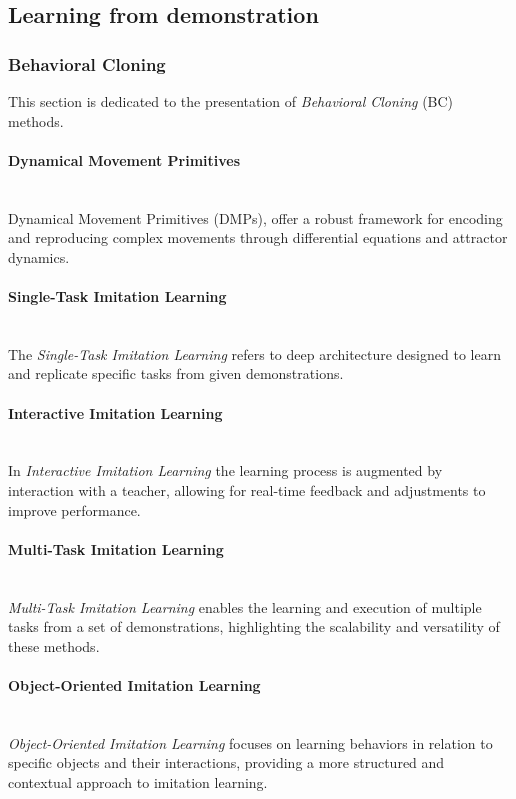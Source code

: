 \subsection{Learning from demonstration}
\label{sec:lfd}
\subsubsection{Behavioral Cloning}
This section is dedicated to the presentation of \textit{ Behavioral Cloning} (BC) methods.
\paragraph*{Dynamical Movement Primitives}\mbox{}\\
Dynamical Movement Primitives (DMPs), offer a robust framework for encoding and reproducing complex movements through differential equations and attractor dynamics.
\paragraph*{Single-Task Imitation Learning}\mbox{}\\
The \textit{Single-Task Imitation Learning} refers to deep architecture designed to learn and replicate specific tasks from given demonstrations.
\paragraph*{Interactive Imitation Learning}\mbox{}\\
In \textit{Interactive Imitation Learning} the learning process is augmented by interaction with a teacher, allowing for real-time feedback and adjustments to improve performance.
\paragraph*{Multi-Task Imitation Learning}\mbox{}\\
\textit{Multi-Task Imitation Learning} enables the learning and execution of multiple tasks from a set of demonstrations, highlighting the scalability and versatility of these methods.
\paragraph*{Object-Oriented Imitation Learning}\mbox{}\\
\textit{Object-Oriented Imitation Learning} focuses on learning behaviors in relation to specific objects and their interactions, providing a more structured and contextual approach to imitation learning.

